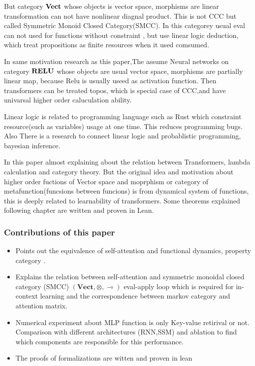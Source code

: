 \documentclass[a4paper,11pt]{article}
\begin{document}
But category \(\bf{Vect}\) whose objects is vector space, morphisms are linear transformation can not have nonlinear diagnal product. This is
not CCC but called Symmetric Monoid Closed Category(SMCC). In this categorey usual eval can not used for functions without constraint , but
use linear logic deduction, which treat propositions as finite resources when it used comsumed.

In same motivation research as this paper\cite{Topos},The assume Neural networks on category \(\bf{RELU}\) whose objects are usual vector space,
morphisms are partially linear map, because Relu is usually useed as activation function. Then transformers can be treated topos, which is
special case of CCC,and have univarsal higher order caluculation ability.

Linear logic is related to programming language such as Rust\cite{Rust} which constraint resource(such as variables) usage at one time. This reduces programming bugs. Also There is a research to connect linear logic and probablistic programming, bayesian inference\cite{Murfet2025}.

In this paper almost explaining about the relation between Transformers,
lambda calculation and category theory. But the original idea and motivation about higher order fuctions of Vector space and moprphism or
category of metafunction(funcsions between funcions) is from dynamical system of functions, this is deeply related to learnability of transformers. Some theorems explained following chapter are written and proven in Lean.

\hypertarget{contributions-of-this-paper}{%
\subsubsection{Contributions of this paper}\label{contributions-of-this-paper}}

\begin{itemize}
\item
  Points out the equivalence of self-attention and functional dynamics,
  property category .
\item
  Explains the relation between self-attention and symmetric monoidal
  closed category (SMCC) \((\mathbf{Vect},\otimes,\multimap)\)
  eval-apply loop which is required for in-context learning and the
  correspondence between markov category and attention matrix.
\item
  Numerical experiment about MLP function is only Key-value retirival or
  not. Comparison with different architectures (RNN,SSM) and ablation to
  find which components are responsible for this performance.
\item
  The proofs of formalizations are witten and proven in lean
\end{itemize}
\end{document}
